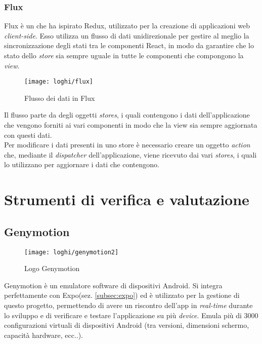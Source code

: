 \subsubsection{Flux} \label{subsubsec:flux}
 Flux è un  che ha ispirato Redux, utilizzato per la 
 creazione di applicazioni web \emph{client-side}. Esso utilizza un flusso di dati 
 unidirezionale per gestire al meglio la sincronizzazione degli stati tra le 
 componenti React, in modo da garantire che lo stato dello \emph{store} sia 
 sempre uguale in tutte le componenti che compongono la \emph{view}.
 
 \begin{figure}[H] 
 	\centering
 	\texttt{[image: loghi/flux]}
 	\caption{Flusso dei dati in Flux}
 \end{figure}
Il flusso parte da degli oggetti \emph{stores}, i quali contengono i dati dell'applicazione che vengono forniti ai vari componenti in modo che la view sia sempre aggiornata con questi dati. \\
Per modificare i dati presenti in uno store è necessario creare un oggetto \emph{action} che, mediante il \emph{dispatcher} dell’applicazione, viene ricevuto dai vari \emph{stores}, i quali lo utilizzano per aggiornare i dati che contengono.

 
\section{Strumenti di verifica e valutazione}

\subsection{Genymotion} \label{subsez:genymotion}
\begin{figure}[H] 
	\centering
	\texttt{[image: loghi/genymotion2]}
	\caption{Logo Genymotion}
\end{figure}
Genymotion è un emulatore software di dispositivi Android. Si integra 
perfettamente con Expo(sez. \ref{subsec:expo}) ed è utilizzato per la gestione
di questo progetto, permettendo di avere un riscontro dell'app in \emph{real-time} durante 
lo sviluppo e di verificare e testare l'applicazione su più \emph{device}. Emula più 
di 3000 configurazioni virtuali di dispositivi Android (tra versioni, dimensioni 
schermo, capacità hardware, ecc..). 

